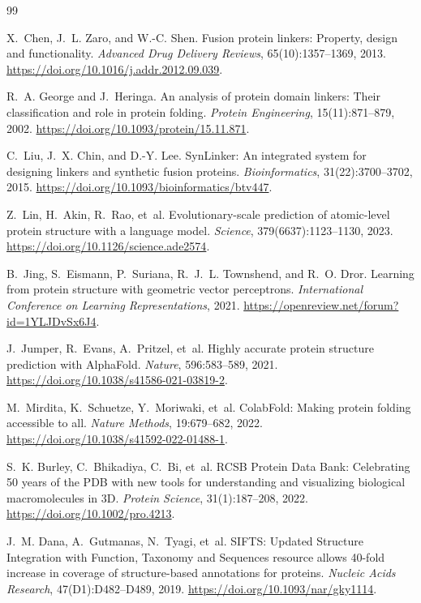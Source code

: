 \documentclass[10pt,a4paper]{article}
\begin{document}
\begin{thebibliography}{99}

X.~Chen, J.~L. Zaro, and W.-C. Shen.
\newblock Fusion protein linkers: Property, design and functionality.
\newblock \emph{Advanced Drug Delivery Reviews}, 65(10):1357--1369, 2013.
\newblock \url{https://doi.org/10.1016/j.addr.2012.09.039}.

R.~A. George and J.~Heringa.
\newblock An analysis of protein domain linkers: Their classification and role in protein folding.
\newblock \emph{Protein Engineering}, 15(11):871--879, 2002.
\newblock \url{https://doi.org/10.1093/protein/15.11.871}.

C.~Liu, J.~X. Chin, and D.-Y. Lee.
\newblock SynLinker: An integrated system for designing linkers and synthetic fusion proteins.
\newblock \emph{Bioinformatics}, 31(22):3700--3702, 2015.
\newblock \url{https://doi.org/10.1093/bioinformatics/btv447}.

Z.~Lin, H.~Akin, R.~Rao, et~al.
\newblock Evolutionary-scale prediction of atomic-level protein structure with a language model.
\newblock \emph{Science}, 379(6637):1123--1130, 2023.
\newblock \url{https://doi.org/10.1126/science.ade2574}.

B.~Jing, S.~Eismann, P.~Suriana, R.~J.~L. Townshend, and R.~O. Dror.
\newblock Learning from protein structure with geometric vector perceptrons.
\newblock \emph{International Conference on Learning Representations}, 2021.
\newblock \url{https://openreview.net/forum?id=1YLJDvSx6J4}.

J.~Jumper, R.~Evans, A.~Pritzel, et~al.
\newblock Highly accurate protein structure prediction with AlphaFold.
\newblock \emph{Nature}, 596:583--589, 2021.
\newblock \url{https://doi.org/10.1038/s41586-021-03819-2}.

M.~Mirdita, K.~Schuetze, Y.~Moriwaki, et~al.
\newblock ColabFold: Making protein folding accessible to all.
\newblock \emph{Nature Methods}, 19:679--682, 2022.
\newblock \url{https://doi.org/10.1038/s41592-022-01488-1}.

S.~K. Burley, C.~Bhikadiya, C.~Bi, et~al.
\newblock RCSB Protein Data Bank: Celebrating 50 years of the PDB with new tools for understanding and visualizing biological macromolecules in 3D.
\newblock \emph{Protein Science}, 31(1):187--208, 2022.
\newblock \url{https://doi.org/10.1002/pro.4213}.

J.~M. Dana, A.~Gutmanas, N.~Tyagi, et~al.
\newblock SIFTS: Updated Structure Integration with Function, Taxonomy and Sequences resource allows 40-fold increase in coverage of structure-based annotations for proteins.
\newblock \emph{Nucleic Acids Research}, 47(D1):D482--D489, 2019.
\newblock \url{https://doi.org/10.1093/nar/gky1114}.


\end{thebibliography}
\end{document}
